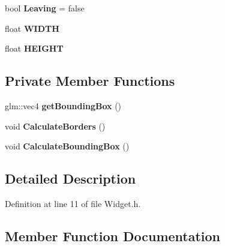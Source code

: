 \begin{DoxyCompactItemize}
\item 
bool {\bfseries Leaving} = false\hypertarget{class_widget_a3cddc771298aa17ced647c3d2d22cd24}{}\label{class_widget_a3cddc771298aa17ced647c3d2d22cd24}

\item 
float {\bfseries W\+I\+D\+TH}\hypertarget{class_widget_a33193351aa4b8102e694d345ba8a39d5}{}\label{class_widget_a33193351aa4b8102e694d345ba8a39d5}

\item 
float {\bfseries H\+E\+I\+G\+HT}\hypertarget{class_widget_acf2283b732b849c102b75575779a9d6b}{}\label{class_widget_acf2283b732b849c102b75575779a9d6b}

\end{DoxyCompactItemize}
\subsection*{Private Member Functions}
\begin{DoxyCompactItemize}
\item 
glm\+::vec4 {\bfseries get\+Bounding\+Box} ()\hypertarget{class_widget_a8efe8eca60924853e4bf72def1695fed}{}\label{class_widget_a8efe8eca60924853e4bf72def1695fed}

\item 
void {\bfseries Calculate\+Borders} ()\hypertarget{class_widget_a492b46162657873f21b81989c6cb2123}{}\label{class_widget_a492b46162657873f21b81989c6cb2123}

\item 
void {\bfseries Calculate\+Bounding\+Box} ()\hypertarget{class_widget_a56ad5e94198b4a7ccd00fe976379af4b}{}\label{class_widget_a56ad5e94198b4a7ccd00fe976379af4b}

\end{DoxyCompactItemize}


\subsection{Detailed Description}


Definition at line 11 of file Widget.\+h.



\subsection{Member Function Documentation}
